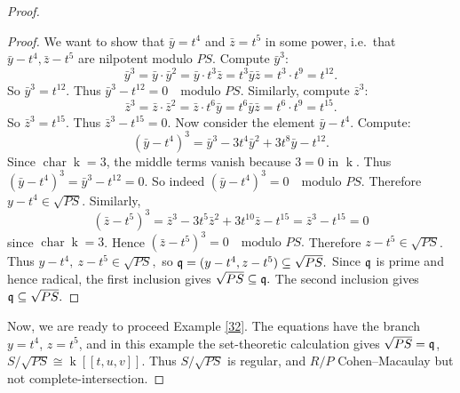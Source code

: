 \documentclass[10pt,a4paper]{amsart}
\theoremstyle{definition}
\theoremstyle{remark}
\newcommand{\kk}{\operatorname{k}}
\newcommand{\q}{\frak{q}}
\begin{document}
\begin{proof}
\begin{proof}
	We want to show that \(\bar y=t^4\) and \(\bar z=t^5\) in some power,
	i.e.\ that
	\(
	\bar y-t^4,  \bar z-t^5
	\)
	are nilpotent modulo \(PS\).
	Compute \(\bar y^3\):
	\[
	\bar y^3=\bar y\cdot \bar y^2=\bar y\cdot t^3\bar z
	=t^3\bar y\bar z=t^3\cdot t^9=t^{12}.
	\]
	So
	\(
	\bar y^3=t^{12}.
	\)
	Thus
	\(
	\bar y^3-t^{12}=0 \quad\text{modulo }PS.
	\)
	Similarly, compute \(\bar z^3\):
	\[
	\bar z^3=\bar z\cdot \bar z^2=\bar z\cdot t^6\bar y
	=t^6\bar y\bar z=t^6\cdot t^9=t^{15}.
	\]
	So
	\(
	\bar z^3=t^{15}.
	\)
	Thus
	\(
	\bar z^3-t^{15}=0.
	\) Now consider the element
	\(
	\bar y-t^4.
	\)
	Compute:
	\[
	(\bar y-t^4)^3
	=\bar y^3-3t^4\bar y^2+3t^8\bar y-t^{12}.
	\]
	Since \(\operatorname{char}\kk=3\), the middle terms vanish because
	\(3=0\) in \(\kk\). Thus
	\(
	(\bar y-t^4)^3=\bar y^3-t^{12}=0.
	\)
	So indeed
	\(
	(\bar y-t^4)^3=0 \quad\text{modulo }PS.
	\)
	Therefore \(y-t^4\in\sqrt{PS}\).
	Similarly,
	\[
	(\bar z-t^5)^3
	=\bar z^3-3t^5\bar z^2+3t^{10}\bar z-t^{15}
	=\bar z^3-t^{15}=0
	\]
	since \(\operatorname{char}\kk=3\). Hence
	\(
	(\bar z-t^5)^3=0 \quad\text{modulo }PS.
	\)
	Therefore \(z-t^5\in\sqrt{PS}\).
	Thus
	\(
	y-t^4,\ z-t^5\in\sqrt{PS},
	\)
	so
	\(
	\q=(y-t^4,z-t^5)\subseteq\sqrt{PS}.
	\)	Since \(\q\) is prime and hence radical, the first inclusion gives
	\(
	\sqrt{PS}\subseteq\q.
	\)
	The second inclusion gives
	\(
	\q\subseteq\sqrt{PS}.
	\)
\end{proof}

Now, we are ready to proceed {Example} \ref{32}.	The equations have the branch $y=t^4$, $z=t^5$, and in this example the
	set-theoretic calculation gives
$
	\sqrt{PS}=\q$,
$S/\sqrt{PS}\cong\kk[[t,u,v]].
$
	Thus
$S/\sqrt{PS}$ is regular, and $R/P$   Cohen--Macaulay but not  complete-intersection.
\end{proof}



 
\end{document}
